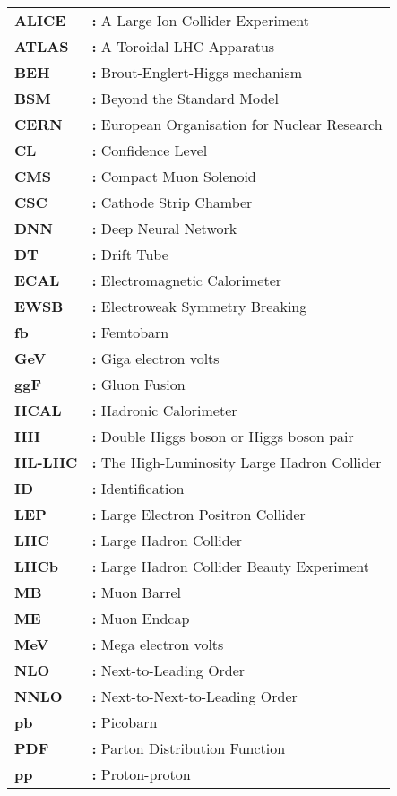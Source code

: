 \begin{tabular}{@{}p{2cm}l}
{\bf ALICE} & {\bf:} A Large Ion Collider Experiment\\
{\bf ATLAS} & {\bf:} A Toroidal LHC Apparatus\\
{\bf BEH} & {\bf:} Brout-Englert-Higgs mechanism\\
{\bf BSM} & {\bf:} Beyond the Standard Model\\
{\bf CERN} & {\bf:} European Organisation for Nuclear Research\\
{\bf CL} & {\bf:} Confidence Level\\
{\bf CMS} & {\bf:} Compact Muon Solenoid\\
{\bf CSC} & {\bf:} Cathode Strip Chamber\\
{\bf DNN} & {\bf:} Deep Neural Network\\
{\bf DT} & {\bf:} Drift Tube\\
{\bf ECAL} & {\bf:} Electromagnetic Calorimeter\\
{\bf EWSB} & {\bf:} Electroweak Symmetry Breaking\\
{\bf fb} & {\bf:} Femtobarn\\
{\bf GeV} & {\bf:} Giga electron volts\\
{\bf ggF} & {\bf:} Gluon Fusion\\
{\bf HCAL} & {\bf:} Hadronic Calorimeter\\
{\bf HH} & {\bf:} Double Higgs boson or Higgs boson pair\\
{\bf HL-LHC} & {\bf:} The High-Luminosity Large Hadron Collider\\
{\bf ID} & {\bf:} Identification\\
{\bf LEP} & {\bf:} Large Electron Positron Collider\\
{\bf LHC} & {\bf:} Large Hadron Collider\\
{\bf LHCb} & {\bf:} Large Hadron Collider Beauty Experiment\\
{\bf MB} & {\bf:} Muon Barrel\\
{\bf ME} & {\bf:} Muon Endcap\\
{\bf MeV} & {\bf:} Mega electron volts\\
{\bf NLO} & {\bf:} Next-to-Leading Order\\
{\bf NNLO} & {\bf:} Next-to-Next-to-Leading Order\\
{\bf pb} & {\bf:} Picobarn\\
{\bf PDF} & {\bf:} Parton Distribution Function\\
{\bf pp} & {\bf:} Proton-proton\\

\end{tabular}
